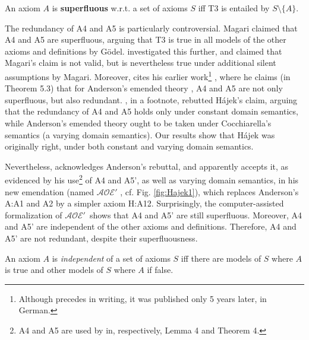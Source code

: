 \documentclass{birkjour}
\newcommand{\AOEH}{$\mathcal{AOE}'$}
\theoremstyle{definition}
\theoremstyle{remark}
\numberwithin{equation}{section}
\begin{document}
\begin{definition}
An axiom $A$ is \textbf{superfluous} w.r.t. a set of axioms $S$ iff T3 is
entailed by $S \setminus \{ A \}$.
\end{definition}

The redundancy of A4 and A5 is particularly controversial. Magari
\cite{Magari1988} claimed that A4 and A5 are superfluous, arguing that T3 is true in all
models of the other axioms and definitions by Gödel.
\citet[p.~5-6]{Hajek_Magari_and_others_1996} investigated this
further, and claimed that Magari's claim is not valid, but is
nevertheless true  under additional silent assumptions by Magari.
Moreover, \citet[p.~2]{Hajek_Magari_and_others_1996} cites his earlier
work\footnote{Although \citep{Hajek_der_Mathematiker_2001} precedes
\citep{Hajek_Magari_and_others_1996} in writing, it was published only
5 years later, in German.} \citep{Hajek_der_Mathematiker_2001}, where
he claims (in Theorem 5.3) that for Anderson's emended theory
\citep{anderson90:_some_emend_of_goedel_ontol_proof}, A4 and A5 are
not only superfluous, but also redundant. \citet[footnote 1 in
p.~1]{AndersonGettings}, in a footnote, rebutted Hájek's claim,
arguing that the redundancy of A4 and A5 holds only under constant
domain semantics, while Anderson's emended theory ought to be taken
under Cocchiarella's semantics \citep{Cocchiarella} (a varying domain
semantics). Our results show that Hájek was originally right, under
both constant and varying domain semantics.

Nevertheless, \citet[p.~7]{Hajek2002} acknowledges Anderson's rebuttal,
and apparently accepts it, as evidenced by his use\footnote{
  A4 and A5 are used by \citet[p.~11]{Hajek2002} in,
  respectively, Lemma 4 and Theorem 4.
}
of A4 and A5', as well as varying domain semantics, in his new
emendation (named \AOEH\/ \citep[sec.~4]{Hajek2002}, cf. Fig.
\ref{fig:Hajek1}), which replaces Anderson's A:A1 and A2 by a simpler
axiom H:A12. Surprisingly, the computer-assisted formalization of
\AOEH\ shows that A4 and A5' are still superfluous. Moreover,
A4 and A5' are independent
of the other axioms and definitions.
Therefore, A4 and A5' are not redundant, despite their superfluousness.

\begin{definition}
  An axiom $A$ is \emph{independent} of a set of axioms $S$ iff
  there are models of $S$ where $A$ is true and other models of
  $S$ where $A$ if false.
\end{definition}
\end{document}
